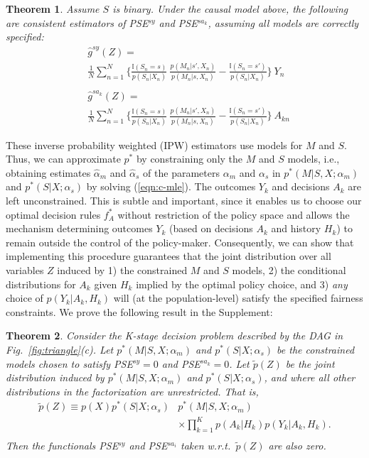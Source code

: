 \documentclass{article}
\newtheorem{thm}{Theorem}
\begin{document}
\begin{thm}
	Assume $S$ is binary. Under the causal model above, the following are consistent estimators of PSE$^{sy}$ and PSE$^{sa_k}$, assuming all models are correctly specified:
	{\small
		\begin{align}
		&\widehat{g}^{sy}(Z) = \\ \nonumber 
		&\frac{1}{N} \sum_{n=1}^{N} \Big\{ \frac{\mathbb{I}(S_n = s)}{p(S_n | X_n)} \ \frac{p(M_{n} | s', X_n)}{p(M_{n} | s, X_n)}
		- \frac{\mathbb{I}(S_n = s')}{p(S_n | X_n)} \Big\} \ Y_n \\ \nonumber \\
		&\widehat{g}^{sa_k}(Z) =\\ \nonumber 
		 &\frac{1}{N} \sum_{n=1}^{N} \Big\{ \frac{\mathbb{I}(S_n = s)}{p(S_n | X_n)} \ \frac{p(M_{n} | s', X_n)}{p(M_{n} | s, X_n)}
		- \frac{\mathbb{I}(S_n = s')}{p(S_n | X_n)} \Big\} \ A_{kn}
		\end{align}
	}
	\label{thm:est}
\end{thm}
These inverse probability weighted (IPW) estimators use models for $M$ and $S$. Thus, we can approximate $p^*$ by constraining only the $M$ and $S$ models, i.e., obtaining estimates $\hat{\alpha}_{m}$ and $\hat{\alpha}_s$ of the parameters $\alpha_{m}$ and $\alpha_s$ in $p^*(M|S,X;\alpha_{m})$ and $p^*(S|X;\alpha_s)$ by solving (\ref{eqn:c-mle}). The outcomes $Y_k$ and decisions $A_k$ are left unconstrained. This is subtle and important, since it enables us to choose our optimal decision rules $f^*_A$ without restriction of the policy space and allows %
the mechanism determining outcomes $Y_k$ (based on decisions $A_k$ and history $H_k$) to remain %
outside the control of the policy-maker. Consequently, we can show that implementing this procedure guarantees that the joint distribution over all variables $Z$ induced by 1) the constrained $M$ and $S$ models, 2) the conditional distributions for $A_k$ given $H_k$ implied by the optimal policy choice, and 3) \emph{any} choice of $p(Y_k | A_k,H_k)$ will (at the population-level) satisfy the specified fairness constraints. We prove the following result in the Supplement:
\begin{thm}
	Consider the K-stage decision problem described by the DAG in Fig.~\ref{fig:triangle}(c). Let $p^*(M|S,X; \alpha_{m})$ and $p^*(S|X; \alpha_s)$ be the constrained models chosen to satisfy PSE$^{sy} = 0$ and PSE$^{sa_k} = 0$. Let $\tilde{p}(Z)$ be the joint distribution induced by $p^*(M|S,X; \alpha_{m})$ and $p^*(S|X;\alpha_s)$, and where all other distributions in the factorization are unrestricted. That is,
	{\small
	\begin{align*}
	\tilde{p}(Z) \equiv p(X)p^*(S|X;\alpha_s) &p^*(M|S,X;\alpha_m)\\
	 &\times \prod_{k=1}^K p(A_k|H_k) p(Y_k|A_k,H_k).\\
	\end{align*}
	}%
	Then the functionals PSE$^{sy}$ and PSE$^{sa_i}$ taken w.r.t.\ $\tilde{p}(Z)$ are also zero.
\end{thm}
\end{document}

